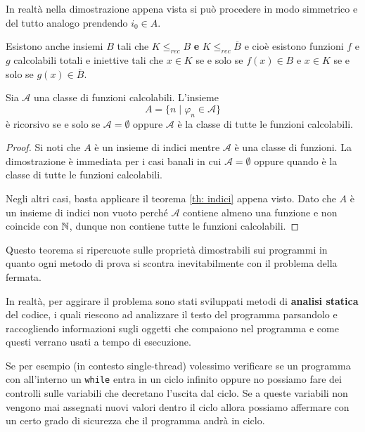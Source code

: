 In realtà nella dimostrazione appena vista si può procedere in
modo simmetrico e del tutto analogo prendendo $i_0 \in A$.

Esistono anche insiemi $B$ tali che $K \leq_{rec} B$ \textbf{e}
$K \leq_{rec} \overline{B}$ e cioè esistono funzioni $f$ e $g$
calcolabili totali e iniettive tali che $x \in K$ se e solo se
$f(x) \in B$ e $x \in K$ se e solo se $g(x) \in \overline{B}$.

\begin{theorem} [Rice] \label{th: rice}
	Sia $\mathcal{A}$ una classe di funzioni calcolabili.
	L'insieme
	\[ A = \{ n \mid \varphi_n \in \mathcal{A} \} \]
	è ricorsivo se e solo se $\mathcal{A} = \emptyset$ oppure
	$\mathcal{A}$ è la classe di tutte le funzioni calcolabili.
	\begin{proof}
		Si noti che $A$ è un insieme di indici mentre
		$\mathcal{A}$ è una classe di funzioni. La dimostrazione
		è immediata per i casi banali in cui
		$\mathcal{A} = \emptyset$ oppure quando è la classe di
		tutte le funzioni calcolabili.

		Negli altri casi, basta applicare il teorema
		\ref{th: indici} appena visto. Dato che $A$ è un insieme
		di indici non vuoto perché $\mathcal{A}$ contiene almeno
		una funzione e non coincide con $\mathbb{N}$, dunque non contiene
		tutte le funzioni calcolabili.
	\end{proof}
\end{theorem}

Questo teorema si ripercuote sulle proprietà dimostrabili sui
programmi in quanto ogni metodo di prova si scontra
inevitabilmente con il problema della fermata.

In realtà, per aggirare il problema sono stati sviluppati metodi
di \textbf{analisi statica} del codice, i quali riescono ad
analizzare il testo del programma parsandolo e raccogliendo
informazioni sugli oggetti che compaiono nel programma e come
questi verrano usati a tempo di esecuzione.

Se per esempio (in contesto single-thread) volessimo verificare
se un programma con all'interno un \verb|while| entra in un
ciclo infinito oppure no possiamo fare dei controlli sulle
variabili che decretano l'uscita dal ciclo. Se a queste variabili
non vengono mai assegnati nuovi valori dentro il ciclo allora
possiamo affermare con un certo grado di sicurezza che il
programma andrà in ciclo.
